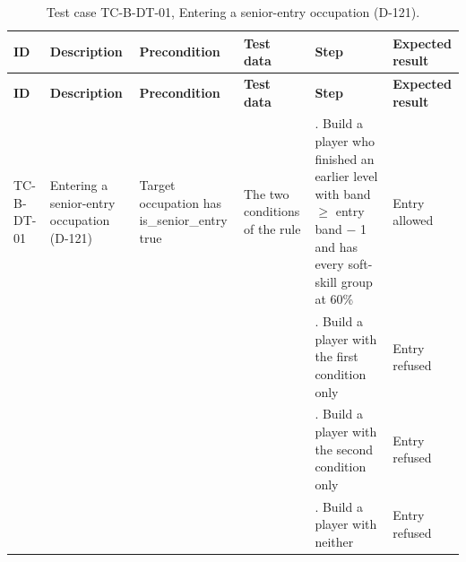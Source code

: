 {\footnotesize{}\renewcommand{\arraystretch}{1.1}
\begin{longtable}{|>{\raggedright\arraybackslash}p{}|>{\raggedright\arraybackslash}p{}|>{\raggedright\arraybackslash}p{}|>{\raggedright\arraybackslash}p{}|>{\raggedright\arraybackslash}p{}|>{\raggedright\arraybackslash}p{}|}
\caption{Test case TC-B-DT-01, Entering a senior-\allowbreak{}entry occupation (D-121).} \\
\hline
\textbf{ID} & \textbf{Description} & \textbf{Precondition} & \textbf{Test data} & \textbf{Step} & \textbf{Expected result} \\ \hline
\endfirsthead
\hline
\textbf{ID} & \textbf{Description} & \textbf{Precondition} & \textbf{Test data} & \textbf{Step} & \textbf{Expected result} \\ \hline
\endhead
TC-B-DT-01 & Entering a senior-\allowbreak{}entry occupation (D-121) & Target occupation has is\_\allowbreak{}senior\_\allowbreak{}entry true & The two conditions of the rule & 1. Build a player who finished an earlier level with band $\geq$ entry band $-$ 1 and has every soft-skill group at 60\% & Entry allowed \\ \cline{5-6}
 &  &  &  & 2. Build a player with the first condition only & Entry refused \\ \cline{5-6}
 &  &  &  & 3. Build a player with the second condition only & Entry refused \\ \cline{5-6}
 &  &  &  & 4. Build a player with neither & Entry refused \\ \hline
\end{longtable}
}


